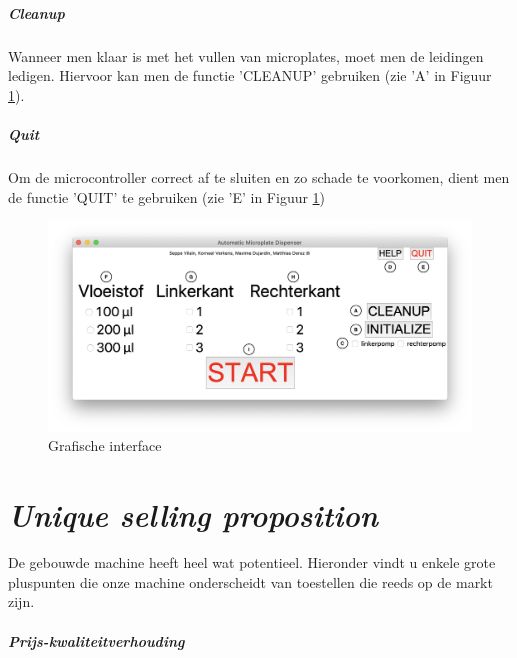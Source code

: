 \documentclass[a4paper,twoside,kulak]{kulakreport} %
\begin{document}
\paragraph{Cleanup}
Wanneer men klaar is met het vullen van microplates, moet men de leidingen ledigen. Hiervoor kan men de functie 'CLEANUP' gebruiken (zie 'A' in Figuur \ref{fig: Grafische interface}).
\paragraph{Quit}
Om de microcontroller correct af te sluiten en zo schade te voorkomen, dient men de functie 'QUIT' te gebruiken (zie 'E' in Figuur \ref{fig: Grafische interface})

\begin{figure}[h]

	\includegraphics[width=1.3\linewidth]{GI_letters.png}
	\caption{Grafische interface}
	\label{fig: Grafische interface}
	
\end{figure} 



\chapter{\textit{Unique selling proposition}}

De gebouwde machine heeft heel wat potentieel. Hieronder vindt u enkele grote pluspunten die onze machine onderscheidt van toestellen die reeds op de markt zijn.

\paragraph{Prijs-kwaliteitverhouding}
\end{document}
